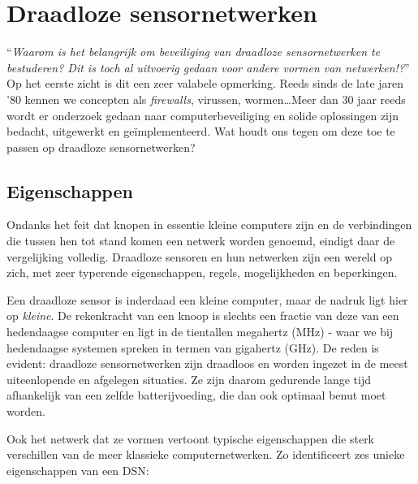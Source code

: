 
\section{Draadloze sensornetwerken}
\label{section:landscape}

``\emph{Waarom is het belangrijk om beveiliging van draadloze sensornetwerken
te bestuderen? Dit is toch al uitvoerig gedaan voor andere vormen van
netwerken!?}'' Op het eerste zicht is dit een zeer valabele opmerking. Reeds
sinds de late jaren '80 kennen we concepten als \emph{firewalls}, virussen,
wormen\dots Meer dan 30 jaar reeds wordt er onderzoek gedaan naar
computerbeveiliging en solide oplossingen zijn bedacht, uitgewerkt en
ge\"implementeerd. Wat houdt ons tegen om deze toe te passen op draadloze
sensornetwerken?

\subsection{Eigenschappen}

Ondanks het feit dat knopen in essentie kleine computers zijn en de
verbindingen die tussen hen tot stand komen een netwerk worden genoemd, eindigt
daar de vergelijking volledig. Draadloze sensoren en hun netwerken zijn een
wereld op zich, met zeer typerende eigenschappen, regels, mogelijkheden en
beperkingen.

Een draadloze sensor is inderdaad een kleine computer, maar de nadruk ligt hier
op \emph{kleine}. De rekenkracht van een knoop is slechts een fractie van deze
van een hedendaagse computer en ligt in de tientallen megahertz (MHz) - waar we
bij hedendaagse systemen spreken in termen van gigahertz (GHz). De reden is
evident: draadloze sensornetwerken zijn draadloos en worden ingezet in de meest
uiteenlopende en afgelegen situaties. Ze zijn daarom gedurende lange tijd
afhankelijk van een zelfde batterijvoeding, die dan ook optimaal benut moet
worden.

Ook het netwerk dat ze vormen vertoont typische eigenschappen die sterk
verschillen van de meer klassieke computernetwerken. Zo identificeert
\citep{blilat2012wireless} zes unieke eigenschappen van een DSN:

